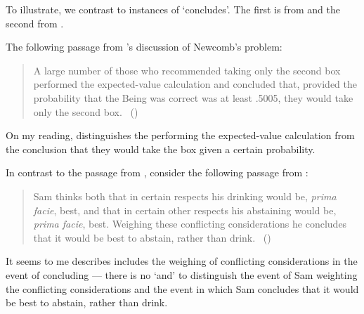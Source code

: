 \begin{note}
  To illustrate, we contrast to instances of `concludes'.
  The first is from \textcite{Gardner:1986wp} and the second from \textcite{Bratman:1979aa}.

  The following passage from \citeauthor{Gardner:1986wp}'s discussion of Newcomb's problem:

  \begin{quote}
    A large number of those who recommended taking only the second box performed the expected-value calculation and concluded that, provided the probability that the Being was correct was at least .5005, they would take only the second box.%
    \mbox{ }\hfill\mbox{(\citeyear[166]{Gardner:1986wp})}
  \end{quote}

  On my reading, \citeauthor{Gardner:1986wp} distinguishes the performing the expected-value calculation from the conclusion that they would take the box given a certain probability.

  In contrast to the passage from \citeauthor{Gardner:1986wp}, consider the following passage from \citeyear{Bratman:1979aa}:

  \begin{quote}
    Sam thinks both that in certain respects his drinking would be, \emph{prima facie}, best, and that in certain other respects his abstaining would be, \emph{prima facie}, best.
    Weighing these conflicting considerations he concludes that it would be best to abstain, rather than drink.%
    \mbox{ }\hfill\mbox{(\citeyear[156]{Bratman:1979aa})}
  \end{quote}

  It seems to me \citeauthor{Bratman:1979aa} describes includes the weighing of conflicting considerations in the event of concluding --- there is no `and' to distinguish the event of Sam weighting the conflicting considerations and the event in which Sam concludes that it would be best to abstain, rather than drink.
\end{note}

